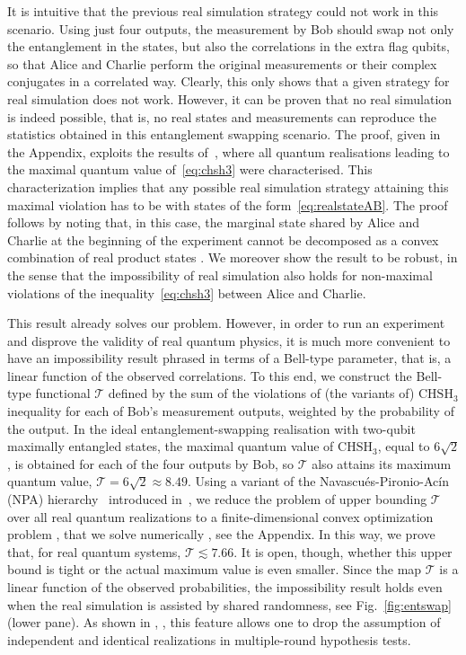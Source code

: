 \documentclass[onecolumn,prx,amsmath,amssymb,12pt]{revtex4-2}
\begin{document}
It is intuitive that the previous real simulation strategy could not work in this scenario. Using just four outputs, the measurement by Bob should swap not only the entanglement in the states, but also the correlations in the extra flag qubits, so that Alice and Charlie perform the original measurements or their complex conjugates in a correlated way. Clearly, this only shows that a given strategy for real simulation does not work. However, it can be proven that no real simulation is indeed possible, that is, no real states and measurements can reproduce the statistics obtained in this entanglement swapping scenario. The proof, given in the Appendix, exploits the results of~\cite{self_testing}, where all quantum realisations leading to the maximal quantum value of~\eqref{eq:chsh3} were characterised. This characterization implies that any possible real simulation strategy attaining this maximal violation has to be with states of the form~\eqref{eq:realstateAB}. The proof follows by noting that, in this case, the marginal state shared by Alice and Charlie at the beginning of the experiment cannot be decomposed as a convex combination of real product states \cite{real_entanglement}. We moreover show the result to be robust, in the sense that the impossibility of real simulation also holds for non-maximal violations of the inequality~\eqref{eq:chsh3} between Alice and Charlie.

This result already solves our problem. However, in order to run an experiment and disprove the validity of real quantum physics, it is much more convenient to have an impossibility result phrased in terms of a Bell-type parameter, that is, a linear function of the observed correlations. To this end, we construct the Bell-type functional $\mathscr{T}$ defined by the sum of the violations of (the variants of) $\text{CHSH}_3$ inequality for each of Bob's measurement outputs, weighted by the probability of the output. In the ideal entanglement-swapping realisation with two-qubit maximally entangled states, the maximal quantum value of $\text{CHSH}_3$, equal to $6\sqrt 2$, is obtained for each of the four outputs by Bob, so $\mathscr{T}$ also attains its maximum quantum value, $\mathscr{T}=6\sqrt 2\approx 8.49$. Using a variant of the Navascu\'es-Pironio-Ac\'in (NPA) hierarchy~\cite{npa, npa2,NOP} introduced in~\cite{moroder}, we reduce the problem of upper bounding $\mathscr{T}$ over all real quantum realizations to a finite-dimensional convex optimization problem \cite{sdp}, that we solve numerically \cite{yalmip, mosek}, see the Appendix. In this way, we prove that, for real quantum systems, $\mathscr{T}\lesssim 7.66$. It is open, though, whether this upper bound is tight or the actual maximum value is even smaller. Since the map $\mathscr{T}$ is a linear function of the observed probabilities, the impossibility result holds even when the real simulation is assisted by shared randomness, see Fig.~\ref{fig:entswap} (lower pane). As shown in \cite{Elkouss}, \cite{Mateus}, this feature allows one to drop the assumption of independent and identical realizations in multiple-round hypothesis tests.
\end{document}
